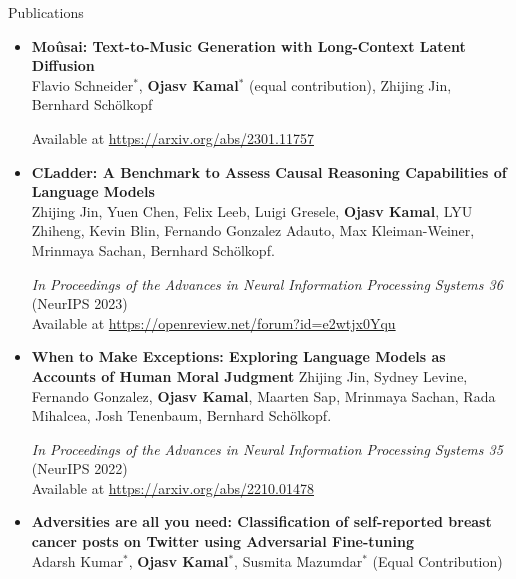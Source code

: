 \documentclass[40]{resume} %
\begin{document}
\begin{rSection}{Publications}

  \vspace{4pt}
  \begin{itemize}[leftmargin=0.15in]

    \vspace{4pt}
    \item \textbf{Moûsai: Text-to-Music Generation with Long-Context Latent Diffusion} \\
          Flavio Schneider$^*$, \textbf{Ojasv Kamal$^*$} (equal contribution), Zhijing Jin, Bernhard Schölkopf

          Available at
          \url{https://arxiv.org/abs/2301.11757}

          \vspace{4pt}

    \item \textbf{CLadder: A Benchmark to Assess Causal Reasoning Capabilities of Language Models}\\
          Zhijing Jin, Yuen Chen, Felix Leeb, Luigi Gresele, \textbf{Ojasv Kamal}, LYU Zhiheng, Kevin Blin, Fernando Gonzalez Adauto, Max Kleiman-Weiner, Mrinmaya Sachan, Bernhard Schölkopf.

          \emph{In Proceedings of the Advances in Neural Information Processing Systems 36} (NeurIPS 2023) \\Available at
          \url{https://openreview.net/forum?id=e2wtjx0Yqu}

    \item \textbf{When to Make Exceptions: Exploring Language Models as Accounts of Human Moral Judgment}
          Zhijing Jin, Sydney Levine, Fernando Gonzalez, \textbf{Ojasv Kamal}, Maarten Sap, Mrinmaya Sachan, Rada Mihalcea, Josh Tenenbaum, Bernhard Schölkopf.

          \emph{In Proceedings of the Advances in Neural Information Processing Systems 35} (NeurIPS 2022) \\Available at
          \url{https://arxiv.org/abs/2210.01478}

          \vspace{4pt}

    \item \textbf{Adversities are all you need: Classification of self-reported breast cancer posts on Twitter using Adversarial Fine-tuning} \\
          Adarsh Kumar$^*$, \textbf{Ojasv Kamal$^*$}, Susmita Mazumdar$^*$ (Equal Contribution)


\end{itemize}
\end{rSection}
\end{document}
